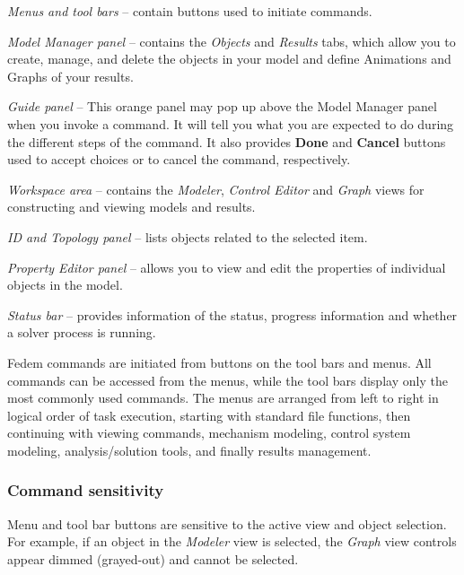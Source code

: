 \begin{bulletlist}
\item{\sl Menus and tool bars} --
  contain buttons used to initiate commands.
\item{\sl Model Manager panel} --
  contains the {\sl Objects} and {\sl Results} tabs, which allow you to create,
  manage, and delete the objects in your model and define Animations and Graphs
  of your results.
\item{\sl Guide panel} --
  This orange panel may pop up above the Model Manager panel when you invoke
  a command. It will tell you what you are expected to do during the different
  steps of the command. It also provides \textbf{Done} and \textbf{Cancel}
  buttons used to accept choices or to cancel the command, respectively.
\item{\sl Workspace area} --
  contains the {\sl Modeler}, {\sl Control Editor} and {\sl Graph} views
  for constructing and viewing models and results.
\item{\sl ID and Topology panel} --
  lists objects related to the selected item.
\item{\sl Property Editor panel} --
  allows you to view and edit the properties of individual objects in the model.
\item{\sl Status bar} --
  provides information of the status, progress information
  and whether a solver process is running.
\end{bulletlist}



Fedem commands are initiated from buttons on the tool bars and menus.
All commands can be accessed from the menus, while the tool bars display only
the most commonly used commands.
The menus are arranged from left to right in logical order of task execution,
starting with standard file functions, then continuing with viewing commands,
mechanism modeling, control system modeling, analysis/solution tools,
and finally results management.


\subsubsection{Command sensitivity}

Menu and tool bar buttons are sensitive to the active view and object
selection. For example, if an object in the {\sl Modeler} view is
selected, the {\sl Graph} view controls appear dimmed (grayed-out) and
cannot be selected.

